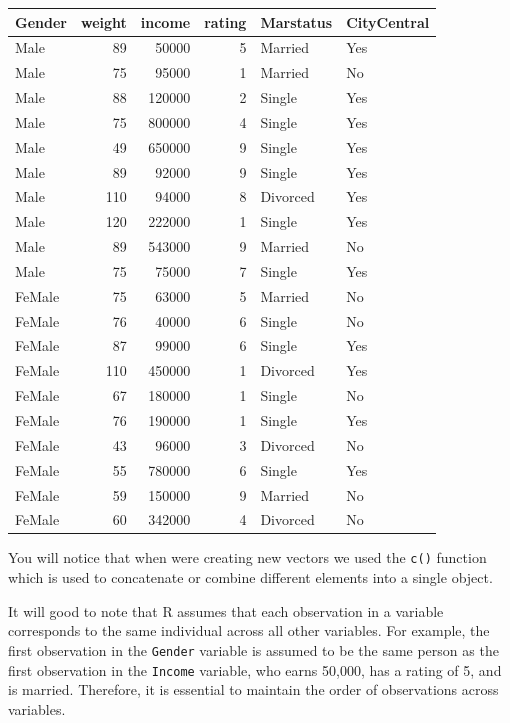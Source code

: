 \documentclass[
]{article}
\begin{document}
\begin{longtable}[]{@{}lrrrll@{}}
\toprule\noalign{}
Gender & weight & income & rating & Marstatus & CityCentral \\
\midrule\noalign{}
\endhead
\bottomrule\noalign{}
\endlastfoot
Male & 89 & 50000 & 5 & Married & Yes \\
Male & 75 & 95000 & 1 & Married & No \\
Male & 88 & 120000 & 2 & Single & Yes \\
Male & 75 & 800000 & 4 & Single & Yes \\
Male & 49 & 650000 & 9 & Single & Yes \\
Male & 89 & 92000 & 9 & Single & Yes \\
Male & 110 & 94000 & 8 & Divorced & Yes \\
Male & 120 & 222000 & 1 & Single & Yes \\
Male & 89 & 543000 & 9 & Married & No \\
Male & 75 & 75000 & 7 & Single & Yes \\
FeMale & 75 & 63000 & 5 & Married & No \\
FeMale & 76 & 40000 & 6 & Single & No \\
FeMale & 87 & 99000 & 6 & Single & Yes \\
FeMale & 110 & 450000 & 1 & Divorced & Yes \\
FeMale & 67 & 180000 & 1 & Single & No \\
FeMale & 76 & 190000 & 1 & Single & Yes \\
FeMale & 43 & 96000 & 3 & Divorced & No \\
FeMale & 55 & 780000 & 6 & Single & Yes \\
FeMale & 59 & 150000 & 9 & Married & No \\
FeMale & 60 & 342000 & 4 & Divorced & No \\
\end{longtable}

You will notice that when were creating new vectors we used the
\texttt{c()} function which is used to concatenate or combine different
elements into a single object.

It will good to note that R assumes that each observation in a variable
corresponds to the same individual across all other variables. For
example, the first observation in the \texttt{Gender} variable is
assumed to be the same person as the first observation in the
\texttt{Income} variable, who earns 50,000, has a rating of 5, and is
married. Therefore, it is essential to maintain the order of
observations across variables.
\end{document}
